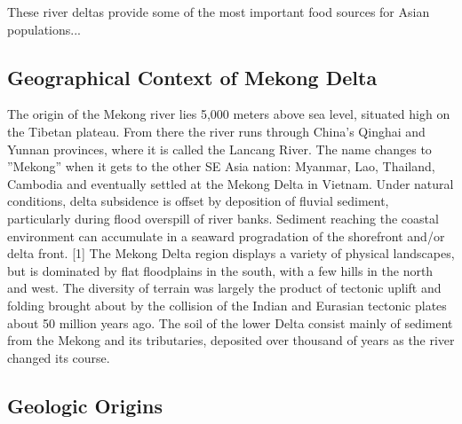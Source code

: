 These river deltas provide some of the most important food sources for Asian populations...


\subsection{Geographical Context of Mekong Delta}

  The origin of the Mekong river lies 5,000 meters above sea level, situated high on the Tibetan plateau. From there the river runs through China's Qinghai and Yunnan provinces, where it is called the Lancang River. The name changes to ''Mekong'' when it gets to the other SE Asia nation: Myanmar, Lao, Thailand, Cambodia and eventually settled at the Mekong Delta in Vietnam. Under natural conditions, delta subsidence is offset by deposition of fluvial sediment, particularly during flood overspill of river banks. Sediment reaching the coastal environment can accumulate in a seaward progradation of the shorefront and/or delta front. [1] The Mekong Delta region displays a variety of physical landscapes, but is dominated by flat floodplains in the south, with a few hills in the north and west. The diversity of terrain was largely the product of tectonic uplift and folding brought about by the collision of the Indian and Eurasian tectonic plates about 50 million years ago. The soil of the lower Delta consist mainly of sediment from the Mekong and its tributaries, deposited over thousand of years as the river changed its course.
	
\subsection{Geologic Origins}

